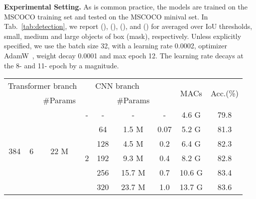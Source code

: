 \documentclass[10pt,twocolumn,letterpaper]{article}
\begin{document}
\noindent\textbf{Experimental Setting.}
As is common practice, the models are trained on the MSCOCO training set and tested on the MSCOCO minival set. In Tab.~\ref{tab:detection}, we report  (),  (),  (), and  () for averaged over IoU thresholds, small, medium and large objects of box (mask), respectively. Unless explicitly specified, we use the batch size 32, with a learning rate 0.0002, optimizer AdamW~\cite{AdamW2017}, weight decay 0.0001 and max epoch 12. The learning rate decays at the 8- and 11- epoch by a magnitude.
~\\

\begin{table}[t]
\centering
\begin{tabular}{c|c|c|c|c|c|c|c|c}
\toprule
\multicolumn{3}{c|}{\small Transformer branch}& \multicolumn{3}{c|}{\small CNN branch}      & \multirow{2}{*}{} & \multirow{2}{*}{MACs} & \multirow{2}{*}{Acc.(\%)} \\ \cline{1-6}
                    &                    &  \#Params             &                  &    & \#Params &                         &                          &                          \\ \hline
\multirow{8}{*}{384} & \multirow{8}{*}{6}  & \multirow{8}{*}{22 M}   & -                  & -   & -         & -                       & 4.6 G                      & 79.8                     \\ \cline{4-9} 
                     &                     &                       & \multirow{5}{*}{2} & 64  & 1.5 M       & 0.07                    & 5.2 G                      & 81.3                     \\ \cline{5-9} 
                     &                     &                       &                    & 128 & 4.5 M       & 0.2                     & 6.4 G                      & 82.3                     \\ \cline{5-9} 
                     &                     &                       &                    & 192 & 9.3 M       & 0.4                     & 8.2 G                       & 82.8                     \\ \cline{5-9} 
                     &                     &                       &                    & 256 & 15.7 M      & 0.7                     & 10.6 G                      & 83.4                     \\ \cline{5-9} 
                     &                     &                       &                    & 320 & 23.7 M      & 1.0                     & 13.7 G                     & 83.6                     \\ \cline{4-9} 

\end{tabular}
\end{table}
\end{document}
